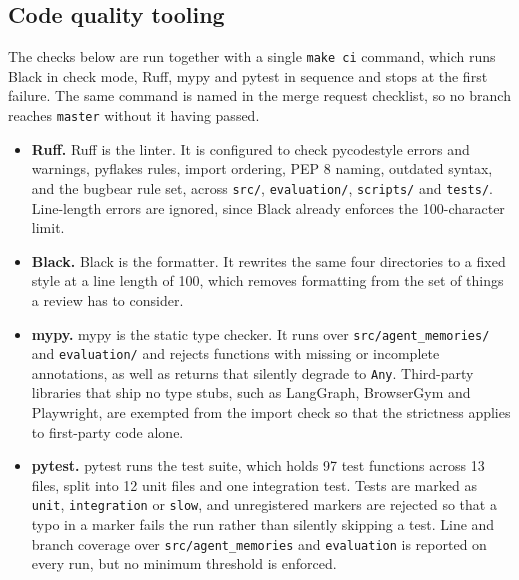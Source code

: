 \subsection{Code quality tooling}\label{sec:code-quality-tooling}

The checks below are run together with a single \texttt{make ci} command, which
runs Black in check mode, Ruff, mypy and pytest in sequence and stops at the
first failure. The same command is named in the merge request checklist, so no
branch reaches \texttt{master} without it having passed.

\begin{itemize}
    \item \textbf{Ruff.} Ruff is the linter. It is configured to check
    pycodestyle errors and warnings, pyflakes rules, import ordering, PEP 8
    naming, outdated syntax, and the bugbear rule set, across \texttt{src/},
    \texttt{evaluation/}, \texttt{scripts/} and \texttt{tests/}. Line-length
    errors are ignored, since Black already enforces the 100-character limit.

    \item \textbf{Black.} Black is the formatter. It rewrites the same four
    directories to a fixed style at a line length of 100, which removes
    formatting from the set of things a review has to consider.

    \item \textbf{mypy.} mypy is the static type checker. It runs over
    \texttt{src/agent\_memories/} and \texttt{evaluation/} and rejects functions
    with missing or incomplete annotations, as well as returns that silently
    degrade to \texttt{Any}. Third-party libraries that ship no type stubs, such
    as LangGraph, BrowserGym and Playwright, are exempted from the import check
    so that the strictness applies to first-party code alone.

    \item \textbf{pytest.} pytest runs the test suite, which holds 97 test
    functions across 13 files, split into 12 unit files and one integration
    test. Tests are marked as \texttt{unit}, \texttt{integration} or
    \texttt{slow}, and unregistered markers are rejected so that a typo in a
    marker fails the run rather than silently skipping a test. Line and branch
    coverage over \texttt{src/agent\_memories} and \texttt{evaluation} is
    reported on every run, but no minimum threshold is enforced.


\end{itemize}
